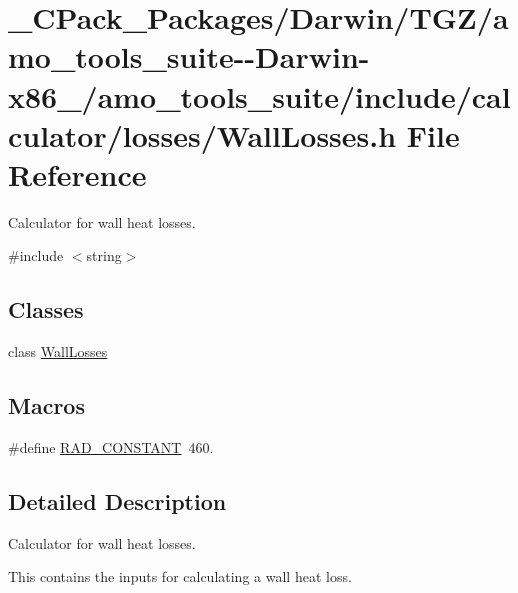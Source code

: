 \hypertarget{___c_pack___packages_2_darwin_2_t_g_z_2amo__tools__suite--_darwin-x86__64_2amo__tools__suite_2ina8c03a77528dfa2a903ef2ceab4e354c}{}\section{\+\_\+\+C\+Pack\+\_\+\+Packages/\+Darwin/\+T\+G\+Z/amo\+\_\+tools\+\_\+suite-\/-\/\+Darwin-\/x86\+\_/amo\+\_\+tools\+\_\+suite/include/calculator/losses/\+Wall\+Losses.h File Reference}
\label{___c_pack___packages_2_darwin_2_t_g_z_2amo__tools__suite--_darwin-x86__64_2amo__tools__suite_2ina8c03a77528dfa2a903ef2ceab4e354c}


Calculator for wall heat losses.  


{\ttfamily \#include $<$string$>$}\newline
\subsection*{Classes}
\begin{DoxyCompactItemize}
\item 
class \hyperlink{class_wall_losses}{Wall\+Losses}
\end{DoxyCompactItemize}
\subsection*{Macros}
\begin{DoxyCompactItemize}
\item 
\#define \hyperlink{___c_pack___packages_2_darwin_2_t_g_z_2amo__tools__suite--_darwin-x86__64_2amo__tools__suite_2ina8c03a77528dfa2a903ef2ceab4e354c_ae9989856134afe2803a2e4c1e56dc7b8}{R\+A\+D\+\_\+\+C\+O\+N\+S\+T\+A\+NT}~460.
\end{DoxyCompactItemize}


\subsection{Detailed Description}
Calculator for wall heat losses. 

This contains the inputs for calculating a wall heat loss.

